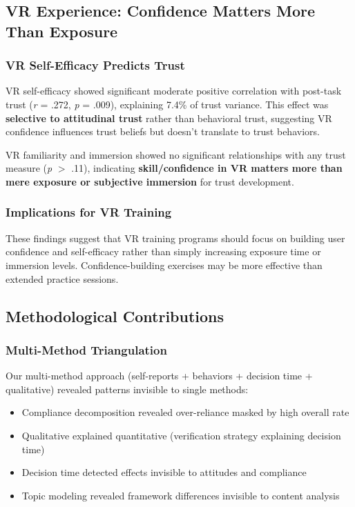 \documentclass[12pt]{article}
\begin{document}
\subsection{VR Experience: Confidence Matters More Than Exposure}

\subsubsection{VR Self-Efficacy Predicts Trust}

VR self-efficacy showed significant moderate positive correlation with post-task trust (\textit{r} = .272, \textit{p} = .009), explaining 7.4\% of trust variance. This effect was \textbf{selective to attitudinal trust} rather than behavioral trust, suggesting VR confidence influences trust beliefs but doesn't translate to trust behaviors.

VR familiarity and immersion showed no significant relationships with any trust measure (\textit{p} $>$ .11), indicating \textbf{skill/confidence in VR matters more than mere exposure or subjective immersion} for trust development.

\subsubsection{Implications for VR Training}

These findings suggest that VR training programs should focus on building user confidence and self-efficacy rather than simply increasing exposure time or immersion levels. Confidence-building exercises may be more effective than extended practice sessions.

\subsection{Methodological Contributions}

\subsubsection{Multi-Method Triangulation}

Our multi-method approach (self-reports + behaviors + decision time + qualitative) revealed patterns invisible to single methods:
\begin{itemize}
    \item Compliance decomposition revealed over-reliance masked by high overall rate
    \item Qualitative explained quantitative (verification strategy explaining decision time)
    \item Decision time detected effects invisible to attitudes and compliance
    \item Topic modeling revealed framework differences invisible to content analysis
\end{itemize}
\end{document}
